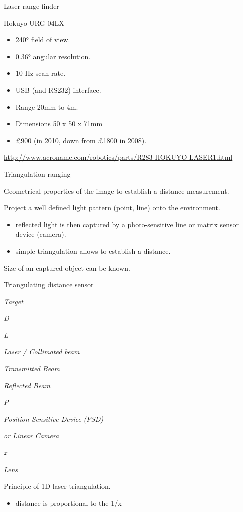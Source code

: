 \documentclass[compress]{beamer}
\begin{document}
\begin{frame}{Laser range finder}

Hokuyo URG-04LX

\begin{itemize}

\item
  240° field of view.
\item
  0.36° angular resolution.
\item
  10 Hz scan rate.
\item
  USB (and RS232) interface.
\item
  Range 20mm to 4m.
\item
  Dimensions 50 x 50 x 71mm
\item
  £900 (in 2010, down from £1800 in 2008).
\end{itemize}

\url{http://www.acroname.com/robotics/parts/R283-HOKUYO-LASER1.html}

\end{frame}

\begin{frame}{Triangulation ranging}

Geometrical properties of the image to establish a distance measurement.

Project a well defined light pattern (\eg point, line) onto the
environment.

\begin{itemize}

\item
  reflected light is then captured by a photo-sensitive line or matrix
  sensor device (camera).
\item
  simple triangulation allows to establish a distance.
\end{itemize}

Size of an captured object can be known.

\end{frame}

\begin{frame}{Triangulating distance sensor}

\emph{Target}

\emph{D}

\emph{L}

\emph{Laser / Collimated beam}

\emph{Transmitted Beam}

\emph{Reflected Beam}

\emph{P}

\emph{Position-Sensitive Device (PSD)}

\emph{or Linear Camera}

\emph{x}

\emph{Lens}

Principle of 1D laser triangulation.

\begin{itemize}

\item
  distance is proportional to the 1/x
\end{itemize}

\end{frame}
\end{document}
